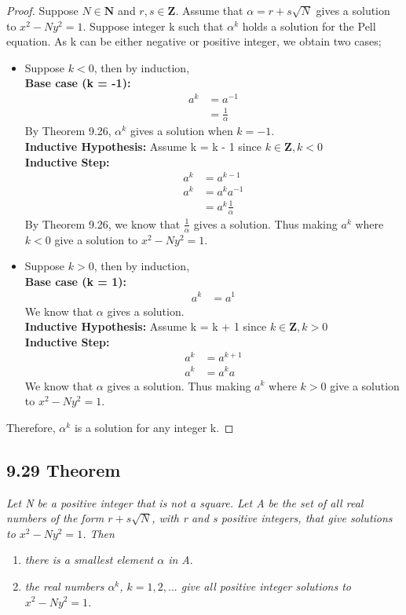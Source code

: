 \documentclass{article}
\begin{document}
\begin{proof}
Suppose $N \in \mathbf{N}$ and $r,s \in \mathbf{Z}$. Assume that $\alpha = r+s\sqrt{N}$ gives a solution to $x^2 - Ny^2 = 1$. Suppose integer k such that $\alpha^k$ holds a solution for the Pell equation. As k can be either negative or positive integer, we obtain two cases;
\begin{itemize}
    \item Suppose $k < 0$, then by induction,\\
    \textbf{Base case (k = -1):  }
    \begin{align*}
        && a^{k} &= a^{-1}&&\\
        &&       &= \frac{1}{\alpha}
    \end{align*}
    By Theorem 9.26, $\alpha^k$ gives a solution when $ k = -1$.\\
    \textbf{Inductive Hypothesis: } Assume k = k - 1 since $k \in \mathbf{Z}, k < 0$ \\
    \textbf{Inductive Step: }     
    \begin{align*}
        && a^{k} &= a^{k-1}&&\\
        && a^{k} &= a^{k}a^{-1}&&\\
        &&       &= a^{k}\frac{1}{\alpha}
    \end{align*}
    By Theorem 9.26, we know that $\frac{1}{\alpha}$ gives a solution. Thus making $a^k$ where $k <0$ give a solution to $x^2 - Ny^2 = 1$.
    \item Suppose $k > 0$, then by induction,\\
    \textbf{Base case (k = 1):  }
    \begin{align*}
        && a^{k} &= a^{1}&&
    \end{align*}
    We know that $\alpha$ gives a solution.\\
    \textbf{Inductive Hypothesis: } Assume k = k + 1 since $k \in \mathbf{Z}, k > 0$ \\
    \textbf{Inductive Step: }     
    \begin{align*}
        && a^{k} &= a^{k+1}&&\\
        && a^{k} &= a^{k}a&&
    \end{align*}
    We know that $\alpha$ gives a solution. Thus making $a^k$ where $k > 0$ give a solution to $x^2 - Ny^2 = 1$.
\end{itemize}
Therefore, $\alpha^k$ is a solution for any integer k.
\end{proof}

\subsection*{9.29 Theorem} 
\quad \textit{Let N be a positive integer that is not a square. Let A be the set of all real numbers of the form $r + s\sqrt{N}$, with r and s positive integers, that give solutions to $x^2 - Ny^2 = 1$. Then}
\begin{enumerate}
    \item \textit{there is a smallest element $\alpha$ in A}.
    \item \textit{the real numbers $\alpha^k$, $k = 1,2,...$ give all positive integer solutions to $x^2  -Ny^2 = 1$.}
\end{enumerate}
\end{document}
